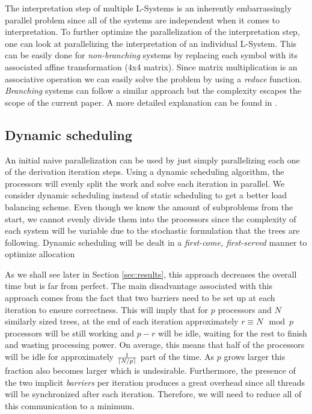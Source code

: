 \documentclass[letterpaper,twoside,11pt]{article}
\begin{document}
\begin{multicols}{2}
The interpretation step of multiple L-Systems is an inherently embarrassingly parallel problem since all of the systems are independent when it comes to interpretation. To further optimize the parallelization of the interpretation step, one can look at parallelizing the interpretation of an individual L-System. This can be easily done for \emph{non-branching} systems by replacing each symbol with its associated affine transformation (4x4 matrix). Since matrix multiplication is an associative operation we can easily solve the problem by using a \emph{reduce} function. \emph{Branching} systems can follow a similar approach but the complexity escapes the scope of the current paper. A more  detailed explanation can be found in \cite{LIPP-2010-PGMS}.

\subsection{Dynamic scheduling} %
\label{sub:dynamic_scheduling}


An initial naive parallelization can be used by just simply parallelizing each one of the derivation iteration steps. Using a dynamic scheduling algorithm, the processors will evenly split the work and solve each iteration in parallel. We consider dynamic scheduling instead of static scheduling to get a better load balancing scheme. Even though we know the amount of subproblems from the start, we cannot evenly divide them into the processors since the complexity of each system will be variable due to the  stochastic formulation that the trees are following. Dynamic scheduling will be dealt in a \emph{first-come, first-served} manner to optimize allocation

As we shall see later in Section \ref{sec:results}, this approach decreases the overall time but is far from perfect. The main disadvantage associated with this approach comes from the fact that two barriers need to be set up  at each iteration to ensure correctness. This will imply that for $p$ processors and $N$ similarly sized trees, at the end of each iteration approximately $r \equiv N \mod p$ processors will be still working and $p - r$ will be idle, waiting for the rest to finish and wasting processing power. On average, this means that half of the processors will be idle for approximately $\frac{1}{\lceil N/p\rceil}$ part of the time. As $p$ grows larger this fraction also becomes larger which is undesirable. Furthermore, the presence of the two implicit \emph{barriers} per iteration produces a great overhead since all threads will be synchronized after each iteration. Therefore, we will need to reduce all of this communication to a minimum.


\end{multicols}
\end{document}
